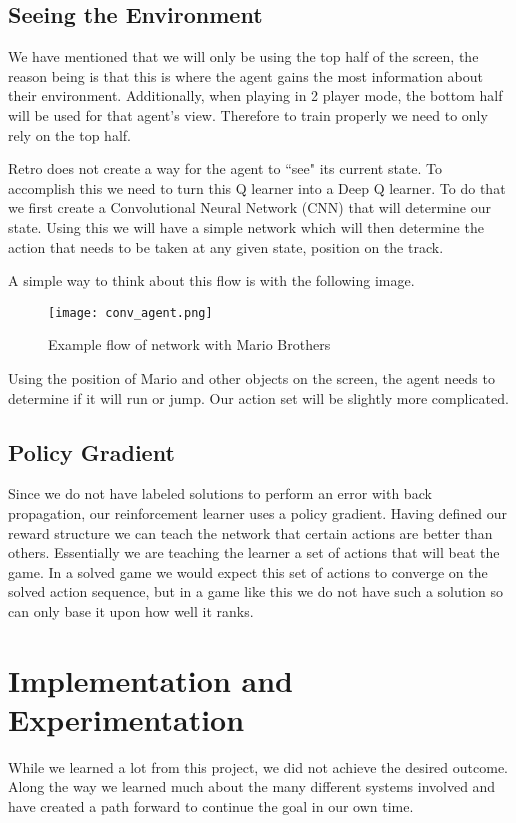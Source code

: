 \documentclass[12pt,letter]{article}
\begin{document}
\subsection{Seeing the Environment}
We have mentioned that we will only be using the top half of the screen, the
reason being is that this is where the agent gains the most information about
their environment. Additionally, when playing in 2 player mode, the bottom half
will be used for that agent's view. Therefore to train properly we need to only
rely on the top half. 

Retro does not create a way for the agent to ``see" its current state. To 
accomplish this we need to turn this Q learner into a Deep Q learner. To do that
we first create a Convolutional Neural Network (CNN) that will determine our
state. Using this we will have a simple network which will then determine the
action that needs to be taken at any given state, position on the track. 

A simple way to think about this flow is with the following image.
\begin{figure}[h]
    \centering
    \texttt{[image: conv\_agent.png]}
    \caption{Example flow of network with Mario Brothers}
\end{figure}
Using the position of Mario and other objects on the screen, the agent needs
to determine if it will run or jump. Our action set will be slightly more
complicated. 

\subsection{Policy Gradient}
Since we do not have labeled solutions to perform an error with back propagation,
our reinforcement learner uses a policy gradient. Having defined our reward 
structure we can teach the network that certain actions are better than others.
Essentially we are teaching the learner a set of actions that will beat the game.
In a solved game we would expect this set of actions to converge on the solved
action sequence, but in a game like this we do not have such a solution so can
only base it upon how well it ranks. 

\section{Implementation and Experimentation}
While we learned a lot from this project, we did not achieve the desired outcome.
Along the way we learned much about the many different systems involved and 
have created a path forward to continue the goal in our own time. 
\end{document}
